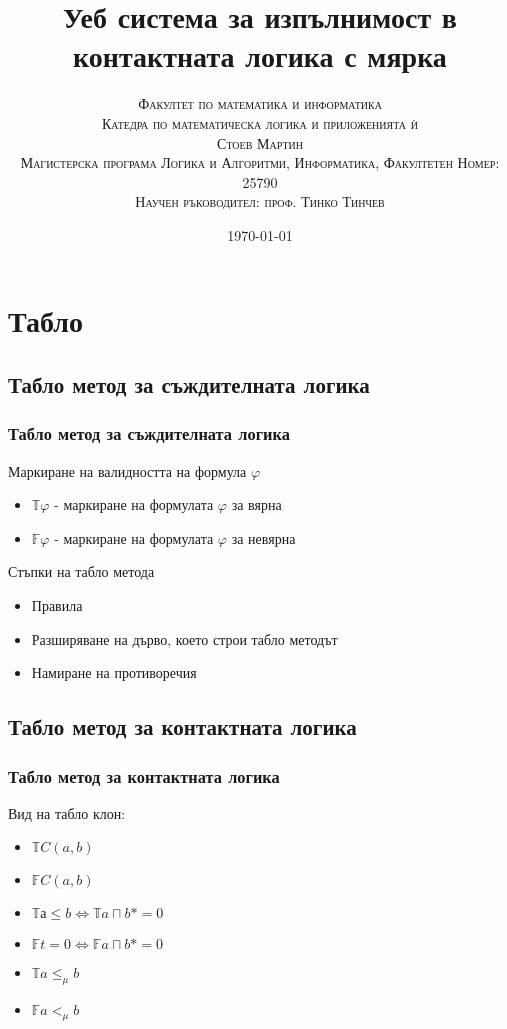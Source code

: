 \documentclass{beamer}
\newcommand{\signT}{\mathbb{T}}
\newcommand{\signF}{\mathbb{F}}
\begin{document}
\title{Уеб система за изпълнимост в контактната логика с мярка}  
\author{\textsc{Факултет по математика и информатика} \\
	\textsc{Катедра по математическа логика и приложенията ѝ} \\ [3mm]
	\textsc{Стоев Мартин} \\ [3mm]
	\textsc{Магистерска програма Логика и Алгоритми, Информатика, Факултетен Номер: 25790} \\ [4mm]
	\small\textsc{Научен ръководител: проф. Тинко Тинчев}}
\date{\today} 
\begin{frame}
\titlepage
\end{frame}


\section{Табло}
\subsection{Табло метод за съждителната логика}
\begin{frame}\frametitle{Табло метод за съждителната логика}
Маркиране на валидността на формула $\varphi$
\begin{itemize}
	\item $\signT \varphi$ - маркиране на формулата $\varphi$ за вярна
	\item $\signF \varphi$ - маркиране на формулата $\varphi$ за невярна
\end{itemize}
\vspace{20px}
Стъпки на табло метода
\begin{itemize}
	\item Правила
	\item Разширяване на дърво, което строи табло методът
	\item Намиране на противоречия
\end{itemize}
\end{frame}

\subsection{Табло метод за контактната логика}
\begin{frame}\frametitle{Табло метод за контактната логика}
Вид на табло клон:
\begin{itemize}
	\item $\signT C(a, b)$
	\item $\signF C(a, b)$ 
	\item $\signT а \leq b \iff \signT a \sqcap b* = 0$
	\item $\signF t = 0 \iff \signF a \sqcap b* = 0$
	\item $\signT a  \le_\mu b$
	\item $\signF a <_\mu b$
\end{itemize}
\end{frame}
\end{document}
